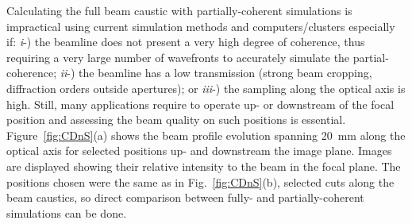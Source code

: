 \begin{refsection}
Calculating the full beam caustic with partially-coherent simulations is impractical using current simulation methods and computers/clusters especially if: \textit{i}-)  the beamline does not present a very high degree of coherence, thus requiring a very large number of wavefronts to accurately simulate the partial-coherence; \textit{ii}-) the beamline has a low transmission (strong beam cropping, diffraction orders outside apertures); or \textit{iii}-) the sampling along the optical axis is high. Still, many applications require to operate up- or downstream of the focal position and assessing the beam quality on such positions is essential. Figure~\ref{fig:CDnS}(a) shows the beam profile evolution spanning 20~mm along the optical axis for selected positions up- and downstream the image plane. Images are displayed showing their relative intensity to the beam in the focal plane. The positions chosen were the same as in Fig.~\ref{fig:CDnS}(b), selected cuts along the beam caustics, so direct comparison between fully- and partially-coherent simulations can be done.

\clearpage


\end{refsection}
